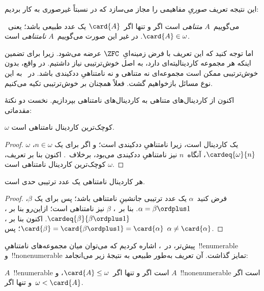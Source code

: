 \documentclass[../../../include/open-logic-section]{subfiles}
\begin{document}
این نتیجه تعریف \emph{صوریِ} مفاهیمی را مجاز می‌سازد که در
 نسبتاً غیرصوری به کار بردیم:

\begin{defn}
می‌گوییم~$A$ \emph{متناهی} است اگر و تنها اگر~$\card{A}$ یک عدد طبیعی
باشد؛ یعنی~$\card{A}\in\omega$. در غیر این صورت می‌گوییم~$A$
\emph{نامتناهی} است.
\end{defn}
\noindent
اما توجه کنید که این تعریف با فرض زمینه‌ایِ~$\ZFC$ عرضه می‌شود. زیرا
برای تضمین اینکه هر مجموعه کاردینالیته‌ای دارد، به اصل خوش‌ترتیبی نیاز
داشتیم. در واقع، بدون خوش‌ترتیبی ممکن است مجموعه‌ای نه متناهی و نه
نامتناهیِ ددکیندی باشد. در~ به این نوع مسائل
بازخواهیم گشت. فعلاً همچنان بر خوش‌ترتیبی تکیه می‌کنیم.

اکنون از کاردینال‌های متناهی به کاردینال‌های نامتناهی بپردازیم. نخست دو
نکتهٔ مقدماتی:

\begin{cor}
$\omega$ کوچک‌ترین کاردینال نامتناهی است.
\end{cor}

\begin{proof}
$\omega$ یک کاردینال است، زیرا نامتناهیِ ددکیندی است؛ و اگر برای یک
$n\in\omega$، $\cardeq{\omega}{n}$، آنگاه~$n$ نیز نامتناهیِ ددکیندی
می‌بود، برخلاف~.
اکنون بنا بر تعریف، $\omega$ کوچک‌ترین کاردینال نامتناهی است.
\end{proof}

\begin{cor}
هر کاردینال نامتناهی یک عدد ترتیبی حدی است.
\end{cor}

\begin{proof}
فرض کنید~$\alpha$ یک عدد ترتیبی جانشینِ نامتناهی باشد؛ پس برای یک
$\beta$، $\alpha=\beta\ordplus1$. بنا بر~،
$\beta$ نیز نامتناهی است؛ ازاین‌رو بنا بر
،
$\cardeq{\beta}{\beta\ordplus1}$. اکنون بنا بر
،
$\card{\beta}=\card{\beta\ordplus1}=\card{\alpha}$؛ پس
$\alpha\neq\card{\alpha}$.
\end{proof}

پیش‌تر، در~، اشاره کردیم که
می‌توان میان مجموعه‌های نامتناهیِ~!!{enumerable} و~!!{nonenumerable}
تمایز گذاشت. آن تعریف به‌طور طبیعی به نتیجهٔ زیر می‌انجامد:

\begin{prop}
$A$~!!{enumerable} است اگر و تنها اگر~$\card{A}\leq\omega$، و
$A$~!!{nonenumerable} است اگر و تنها اگر~$\omega<\card{A}$.
\end{prop}
\end{document}
